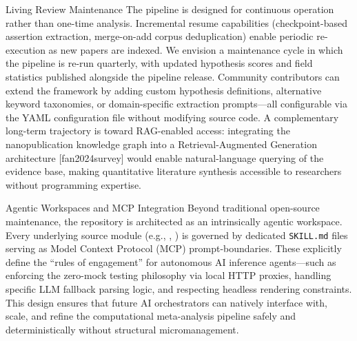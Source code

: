 \documentclass[
  ignorenonframetext,
]{beamer}
\providecommand{\citep}[1]{[#1]}
\begin{document}
\begin{frame}{Living Review Maintenance}
\protect{}\label{living-review-maintenance}
The pipeline is designed for continuous operation rather than one-time
analysis. Incremental resume capabilities (checkpoint-based assertion
extraction, merge-on-add corpus deduplication) enable periodic
re-execution as new papers are indexed. We envision a maintenance cycle
in which the pipeline is re-run quarterly, with updated hypothesis
scores and field statistics published alongside the pipeline release.
Community contributors can extend the framework by adding custom
hypothesis definitions, alternative keyword taxonomies, or
domain-specific extraction prompts---all configurable via the YAML
configuration file without modifying source code. A complementary
long-term trajectory is toward RAG-enabled access: integrating the
nanopublication knowledge graph into a Retrieval-Augmented Generation
architecture \citep{fan2024survey} would enable natural-language
querying of the evidence base, making quantitative literature synthesis
accessible to researchers without programming expertise.

\begin{block}{Agentic Workspaces and MCP Integration}
\protect{}\label{agentic-workspaces-and-mcp-integration}
Beyond traditional open-source maintenance, the repository is
architected as an intrinsically agentic workspace. Every underlying
source module (e.g., ,
) is governed by dedicated \texttt{SKILL.md}
files serving as Model Context Protocol (MCP) prompt-boundaries. These
explicitly define the ``rules of engagement'' for autonomous AI
inference agents---such as enforcing the zero-mock testing philosophy
via local HTTP proxies, handling specific LLM fallback parsing logic,
and respecting headless rendering constraints. This design ensures that
future AI orchestrators can natively interface with, scale, and refine
the computational meta-analysis pipeline safely and deterministically
without structural micromanagement.
\end{block}


\end{frame}
\end{document}
